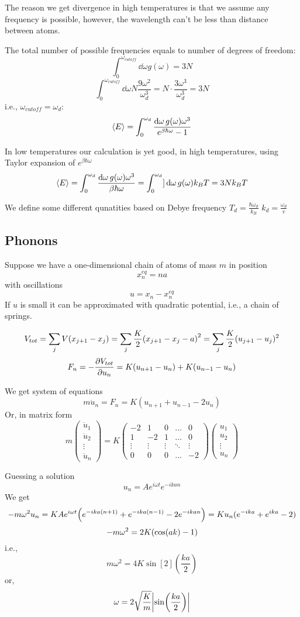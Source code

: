 The reason we get divergence in high temperatures is that we assume any frequency is possible, however, the wavelength can't be less than distance between atoms.

The total number of possible frequencies equals to number of degrees of freedom:
$$\int_0^{\omega_{cutoff}} \dd{\omega} g(\omega) = 3N$$
$$\int_0^{\omega_{cutoff}} \dd{\omega}N \frac{9\omega^2}{\omega_d^3} = N\cdot \frac{3\omega^3}{\omega_d^3}=3N$$
i.e., $\omega_{cutoff} = \omega_d$:
$$\expval{E} = \int_0^{\omega_d} \frac{\dd{\omega} g(\omega) \omega^3}{e^{\beta \hbar \omega}-1}$$

In low temperatures our calculation is yet good, in high temperatures, using Taylor expansion of $e^{\beta \hbar \omega}$
$$\expval{E} = \int_0^{\omega_d} \frac{\dd{\omega} g(\omega) \omega^3}{\beta \hbar \omega} = \int_0^{\omega_d} ]\dd{\omega} g(\omega) k_B T = 3Nk_B T$$

We define some different qunatities based on Debye frequency
$T_d = \frac{\hbar \omega_d}{k_B}$
$k_d = \frac{ \omega_d}{v}$

\subsection{Phonons}
Suppose we have a one-dimensional chain of atoms of mass $m$ in position
$$x_n^{eq} = na$$
with  oscillations
$$u =x_n - x_n^{eq}$$
If $u$ is small it can be approximated with quadratic potential, i.e., a chain of springs.

$$V_{tot} = \sum_j V(x_{j+1}-x_j) = \sum_j \frac{K}{2} \qty(x_{j+1} -x_j -a)^2 = \sum_j \frac{K}{2} (u_{j+1}-u_j)^2 $$
$$F_n = -\pdv{V_{tot}}{u_n} = K(u_{n+1}-u_n) + K(u_{n-1}-u_n)$$

We get system of equations
$$m\ddot{u}_n = F_n = K(u_{n+1} + u_{n-1} - 2u_n)$$
Or, in matrix form
$$m\begin{pmatrix}
\ddot{u}_1\\\ddot{u}_2\\\vdots \\\ddot{u}_n
\end{pmatrix} = K\begin{pmatrix}
-2&1&0&\dots&0\\
1&-2&1&\dots& 0\\
\vdots&\vdots&\vdots&\ddots&\vdots\\
0&0&0&\dots &-2
\end{pmatrix}\begin{pmatrix}
u_1\\u_2\\\vdots \\u_n
\end{pmatrix} $$

Guessing a solution
$$u_n = A e^{i\omega t} e^{-ikan}$$
We get
$$-m\omega^2u_n = K A  e^{i\omega t}\qty( e^{-ika(n+1)}+e^{-ika(n-1)} - 2e^{-ikan} ) = Ku_n(e^{-ika} + e^{ika} -2)$$
$$-m\omega^2 = 2K\qty(\cos(ak)-1)$$
i.e.,
$$m\omega^2 = 4K \sin[2](\frac{ka}{2})$$
or,
$$\omega = 2\sqrt{\frac{K}{m}} \abs{\sin(\frac{ka}{2})}$$